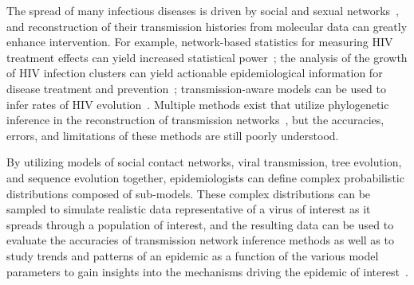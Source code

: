 The spread of many infectious diseases is driven by social and sexual networks~\cite{Rivas2012}, and reconstruction of their transmission histories from molecular data can greatly enhance intervention. For example, network-based statistics for measuring \gls{HIV} treatment effects can yield increased statistical power~\cite{Wertheim2011}; the analysis of the growth of \gls{HIV} infection clusters can yield actionable epidemiological information for disease treatment and prevention~\cite{Aldous2012,Brenner2013}; transmission-aware models can be used to infer rates of \gls{HIV} evolution~\cite{Vrancken2014}. Multiple methods exist that utilize phylogenetic inference in the reconstruction of transmission networks~\cite{Prosperi2011,Ragonnet-Cronin2013,Moshiri2018b,Balaban2019}, but the accuracies, errors, and limitations of these methods are still poorly understood.

By utilizing models of social contact networks, viral transmission, tree evolution, and sequence evolution together, epidemiologists can define complex probabilistic distributions composed of sub-models. These complex distributions can be sampled to simulate realistic data representative of a virus of interest as it spreads through a population of interest, and the resulting data can be used to evaluate the accuracies of transmission network inference methods as well as to study trends and patterns of an epidemic as a function of the various model parameters to gain insights into the mechanisms driving the epidemic of interest~\cite{Ratmann2017}.

